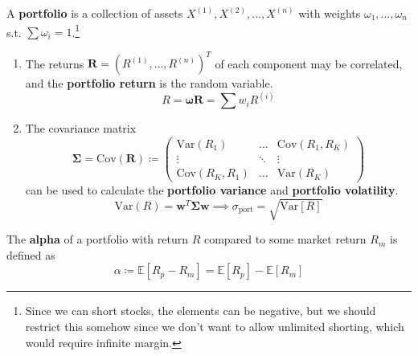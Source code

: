 \documentclass{article}
\begin{document}
  \begin{definition}[Portfolio]
    A \textbf{portfolio} is a collection of assets $X^{(1)}, X^{(2)}, \ldots, X^{(n)}$ with weights $\omega_1, \ldots, \omega_n$ s.t. $\sum \omega_i = 1$.\footnote{Since we can short stocks, the elements can be negative, but we should restrict this somehow since we don't want to allow unlimited shorting, which would require infinite margin. } 
    \begin{enumerate}
      \item The returns $\mathbf{R} = (R^{(1)}, \ldots, R^{(n)})^T$ of each component may be correlated, and the \textbf{portfolio return} is the random variable. 
        \begin{equation}
          R = \boldsymbol{\omega} \mathbf{R} = \sum w_i R^{(i)}
        \end{equation}

      \item The covariance matrix
      \begin{equation}
        \boldsymbol{\Sigma} = \mathrm{Cov}(\mathbf{R}) \coloneqq \begin{pmatrix} \mathrm{Var}(R_1) & \ldots & \mathrm{Cov}(R_1, R_K) \\ \vdots & \ddots & \vdots \\ \mathrm{Cov}(R_K, R_1) & \ldots & \mathrm{Var}(R_K) \end{pmatrix} 
      \end{equation}
      can be used to calculate the \textbf{portfolio variance} and \textbf{portfolio volatility}. 
      \begin{equation}
        \mathrm{Var}(R) = \mathbf{w}^T \boldsymbol{\Sigma} \mathbf{w} \implies \sigma_{\mathrm{port}} = \sqrt{\mathrm{Var}[R]}
      \end{equation}
    \end{enumerate}
  \end{definition}

  \begin{definition}[Alpha]
    The \textbf{alpha} of a portfolio with return $R$ compared to some market return $R_m$ is defined as 
    \begin{equation}
      \alpha \coloneqq \mathbb{E}[R_p - R_m] = \mathbb{E}[R_p] - \mathbb{E}[R_m]
    \end{equation}
  \end{definition}
\end{document}
